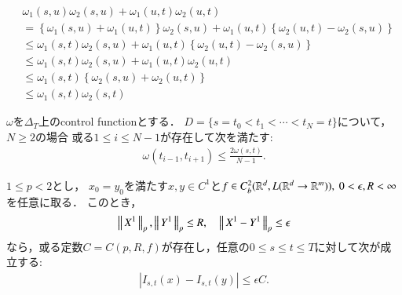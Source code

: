 	\begin{prf}
		\begin{align}
			&\omega_1(s,u)\omega_2(s,u) + \omega_1(u,t)\omega_2(u,t) \\
			&= \left\{ \omega_1(s,u) + \omega_1(u,t) \right\}\omega_2(s,u) + \omega_1(u,t)\left\{\omega_2(u,t) - \omega_2(s,u)\right\} \\
			&\leq \omega_1(s,t)\omega_2(s,u) + \omega_1(u,t)\left\{\omega_2(u,t) - \omega_2(s,u)\right\} \\
			&\leq \omega_1(s,t)\omega_2(s,u) + \omega_1(u,t)\omega_2(u,t) \\
			&\leq \omega_1(s,t)\left\{ \omega_2(s,u) + \omega_2(u,t)\right\} \\
			&\leq \omega_1(s,t)\omega_2(s,t)
		\end{align}
	\end{prf}
	
	\begin{screen}
		\begin{lem}\label{lem:control_function_min}
			$\omega$を$\Delta_T$上のcontrol functionとする．
			$D = \{s = t_0 < t_1 < \cdots < t_N= t\}$について，$N \geq 2$の場合
			或る$1 \leq i \leq N-1$が存在して次を満たす:
			\begin{align}
				\omega(t_{i-1},t_{i+1})
				\leq \frac{2 \omega(s,t)}{N-1}.
				\label{eq:lem_control_function_min}
			\end{align}
		\end{lem}
	\end{screen}
	
	\begin{prf}
		\QED
	\end{prf}
	
	\begin{screen}
		\begin{thm}\label{thm:continuity_theorem_1}
			$1 \leq p < 2$とし，
			$x_0 = y_0$を満たす$x,y \in C^1$と$f \in C^2_b(\mathbb{R}^d,L(\mathbb{R}^d \rightarrow \mathbb{R}^m)),\ 0 < \epsilon, R < \infty$を任意に取る．
			このとき，
			\begin{align}
				\left\|\, X^1\, \right\|_{p},\left\|\, Y^1\, \right\|_{p} \leq R,
				\quad \left\|\, X^1 - Y^1\, \right\|_{p} \leq \epsilon
			\end{align}
			なら，或る定数$C = C(p,R,f)$が存在し，任意の$0 \leq s \leq t \leq T$に対して次が成立する:
			\begin{align}
				\left| I_{s,t}(x) - I_{s,t}(y) \right| \leq \epsilon C.
			\end{align}
		\end{thm}
	\end{screen}
	
